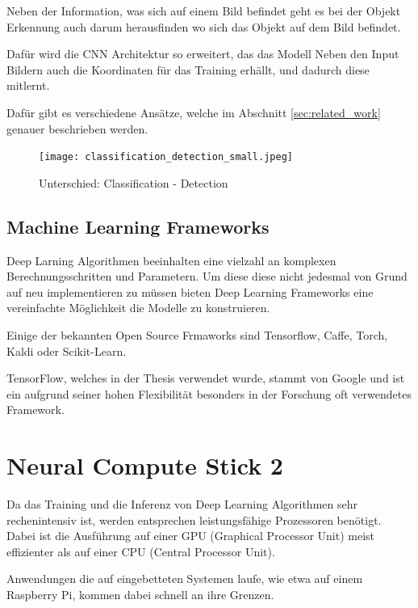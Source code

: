 Neben der Information, was sich auf einem Bild befindet geht 
es bei der Objekt Erkennung auch darum herausfinden wo sich das 
Objekt auf dem Bild befindet.

Dafür wird die CNN Architektur so erweitert, das das Modell 
Neben den Input Bildern auch die Koordinaten für das 
Training erhällt, und dadurch diese mitlernt.

Dafür gibt es verschiedene Ansätze, welche im Abschnitt \ref{sec:related_work}
genauer beschrieben werden.

\begin{figure}[H]
    \centering
    \label{fig:class_vs_det}
    \texttt{[image: classification\_detection\_small.jpeg]}
    \caption{Unterschied: Classification - Detection}
\end{figure}


\subsection{Machine Learning Frameworks}

Deep Larning Algorithmen beeinhalten eine vielzahl an komplexen
Berechnungsschritten und Parametern. Um diese diese nicht jedesmal 
von Grund auf neu implementieren zu müssen bieten Deep Learning 
Frameworks eine vereinfachte Möglichkeit die Modelle zu konstruieren.

Einige der bekannten Open Source Frmaworks sind Tensorflow,
Caffe, Torch, Kaldi oder Scikit-Learn.


TensorFlow, welches in der Thesis verwendet wurde, stammt von 
Google und ist ein aufgrund seiner hohen Flexibilität besonders 
in der Forschung oft verwendetes Framework.



\section{Neural Compute Stick 2}\label{ncs2}

Da das Training und die Inferenz von Deep Learning Algorithmen
 sehr rechenintensiv ist, werden entsprechen leistungsfähige 
Prozessoren benötigt. Dabei ist die Ausführung auf einer GPU 
(Graphical Processor Unit) meist effizienter als auf einer 
CPU (Central Processor Unit).

Anwendungen die auf eingebetteten Systemen laufe, wie etwa 
auf einem Raspberry Pi, kommen dabei schnell an ihre 
Grenzen.

